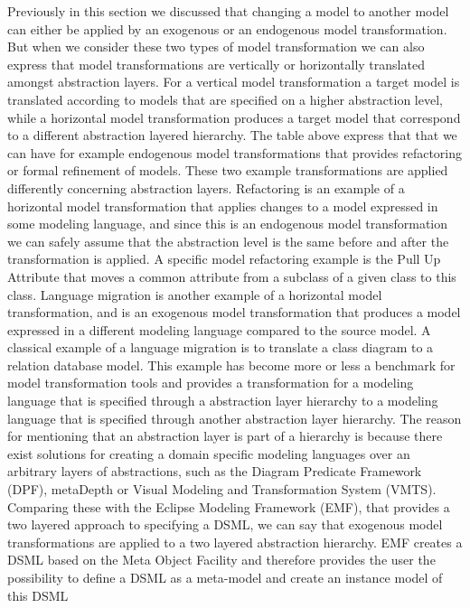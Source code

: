 Previously in this section we discussed that changing a model to another model 
can either be applied by an exogenous or an endogenous model transformation.
But when we consider these two types of model transformation we can also express
that model transformations are vertically or horizontally translated amongst
abstraction layers. For a vertical model transformation a target model is
translated according to models that are specified on a higher abstraction level,
while a horizontal model transformation produces a target model that correspond
to a different abstraction layered hierarchy. The table above express that that we can have
for example endogenous model transformations that provides refactoring or
formal refinement of models. These two example transformations are applied
differently concerning abstraction layers. Refactoring is an example of a
horizontal model transformation that applies changes to a model expressed in
some modeling language, and since this is an endogenous model transformation we
can safely assume that the abstraction level is the same before and after the
transformation is applied. A specific model refactoring example is the Pull Up
Attribute\cite{Henshin_2010} that moves a common attribute from a subclass of a
given class to this class. Language migration is another example of a horizontal
model transformation, and is an exogenous model transformation that produces a
model expressed in a different modeling language compared to the source model.
A classical example of a language migration is to translate a class diagram to a
relation database model. This example has become more or less a benchmark for
model transformation tools and provides a transformation for a modeling language
that is specified through a abstraction layer hierarchy to a modeling language
that is specified through another abstraction layer hierarchy. The reason for
mentioning that an abstraction layer is part of a hierarchy is because there
exist solutions for creating a domain specific modeling languages over an
arbitrary layers of abstractions, such as the Diagram Predicate
Framework\cite{Lamo2013} (DPF), metaDepth\cite{de2010deep} or Visual Modeling
and Transformation System\cite{levendovszky2005systematic} (VMTS). Comparing
these with the Eclipse Modeling Framework (EMF), that provides a two layered
approach to specifying a DSML, we can say that exogenous model transformations
are applied to a two layered abstraction hierarchy. EMF creates a DSML based on
the Meta Object Facility and therefore provides the user the possibility to
define a DSML as a meta-model and create an instance model of this DSML
